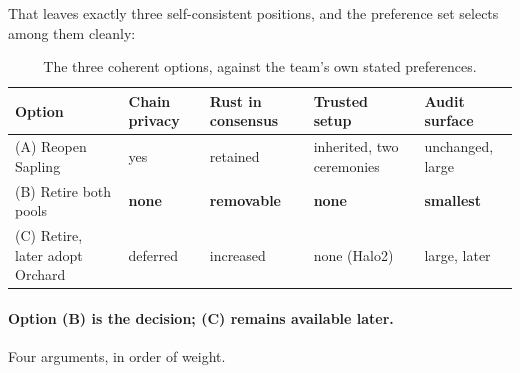 That leaves exactly three self-consistent positions, and the preference set selects among them
cleanly:

\begin{table}[H]
\centering\footnotesize
\caption{The three coherent options, against the team's own stated preferences.}
\label{tab:shielded-options}
\begin{tabular}{@{}lllll@{}}
\toprule
Option & Chain privacy & Rust in consensus & Trusted setup & Audit surface \\
\midrule
(A) Reopen Sapling & yes & retained & inherited, two ceremonies & unchanged, large \\
(B) Retire both pools & \textbf{none} & \textbf{removable} & \textbf{none} & \textbf{smallest} \\
(C) Retire, later adopt Orchard & deferred & increased & none (Halo2) & large, later \\
\bottomrule
\end{tabular}
\end{table}

\paragraph{Option (B) is the decision; (C) remains available later.} Four arguments, in order of
weight.

